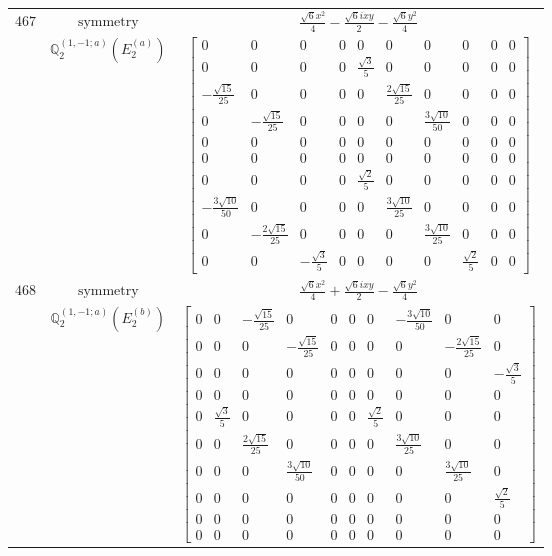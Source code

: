 \documentclass[fleqn,8pt,landscape]{jsarticle}
\begin{document}
\begin{longtable}{ccc}
$ 467 $ & $ \text{symmetry} $ & $ \frac{\sqrt{6} x^{2}}{4} - \frac{\sqrt{6} i x y}{2} - \frac{\sqrt{6} y^{2}}{4} $ \\
$  $ & $ \mathbb{Q}_{2}^{(1,-1;a)}(E_{2}^{(a)}) $ & $ \begin{bmatrix} 0 & 0 & 0 & 0 & 0 & 0 & 0 & 0 & 0 & 0 \\ 0 & 0 & 0 & 0 & \frac{\sqrt{3}}{5} & 0 & 0 & 0 & 0 & 0 \\ - \frac{\sqrt{15}}{25} & 0 & 0 & 0 & 0 & \frac{2 \sqrt{15}}{25} & 0 & 0 & 0 & 0 \\ 0 & - \frac{\sqrt{15}}{25} & 0 & 0 & 0 & 0 & \frac{3 \sqrt{10}}{50} & 0 & 0 & 0 \\ 0 & 0 & 0 & 0 & 0 & 0 & 0 & 0 & 0 & 0 \\ 0 & 0 & 0 & 0 & 0 & 0 & 0 & 0 & 0 & 0 \\ 0 & 0 & 0 & 0 & \frac{\sqrt{2}}{5} & 0 & 0 & 0 & 0 & 0 \\ - \frac{3 \sqrt{10}}{50} & 0 & 0 & 0 & 0 & \frac{3 \sqrt{10}}{25} & 0 & 0 & 0 & 0 \\ 0 & - \frac{2 \sqrt{15}}{25} & 0 & 0 & 0 & 0 & \frac{3 \sqrt{10}}{25} & 0 & 0 & 0 \\ 0 & 0 & - \frac{\sqrt{3}}{5} & 0 & 0 & 0 & 0 & \frac{\sqrt{2}}{5} & 0 & 0 \end{bmatrix} $ \\ \hline
$ 468 $ & $ \text{symmetry} $ & $ \frac{\sqrt{6} x^{2}}{4} + \frac{\sqrt{6} i x y}{2} - \frac{\sqrt{6} y^{2}}{4} $ \\
$  $ & $ \mathbb{Q}_{2}^{(1,-1;a)}(E_{2}^{(b)}) $ & $ \begin{bmatrix} 0 & 0 & - \frac{\sqrt{15}}{25} & 0 & 0 & 0 & 0 & - \frac{3 \sqrt{10}}{50} & 0 & 0 \\ 0 & 0 & 0 & - \frac{\sqrt{15}}{25} & 0 & 0 & 0 & 0 & - \frac{2 \sqrt{15}}{25} & 0 \\ 0 & 0 & 0 & 0 & 0 & 0 & 0 & 0 & 0 & - \frac{\sqrt{3}}{5} \\ 0 & 0 & 0 & 0 & 0 & 0 & 0 & 0 & 0 & 0 \\ 0 & \frac{\sqrt{3}}{5} & 0 & 0 & 0 & 0 & \frac{\sqrt{2}}{5} & 0 & 0 & 0 \\ 0 & 0 & \frac{2 \sqrt{15}}{25} & 0 & 0 & 0 & 0 & \frac{3 \sqrt{10}}{25} & 0 & 0 \\ 0 & 0 & 0 & \frac{3 \sqrt{10}}{50} & 0 & 0 & 0 & 0 & \frac{3 \sqrt{10}}{25} & 0 \\ 0 & 0 & 0 & 0 & 0 & 0 & 0 & 0 & 0 & \frac{\sqrt{2}}{5} \\ 0 & 0 & 0 & 0 & 0 & 0 & 0 & 0 & 0 & 0 \\ 0 & 0 & 0 & 0 & 0 & 0 & 0 & 0 & 0 & 0 \end{bmatrix} $ \\ \hline

\end{longtable}
\end{document}
